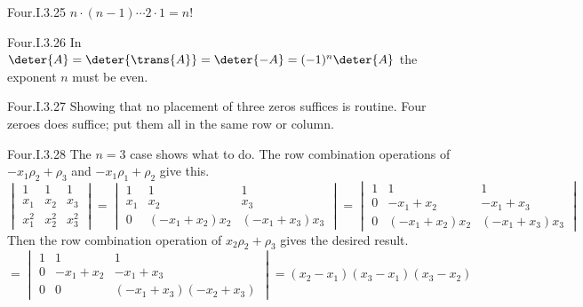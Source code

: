\begin{ans}{Four.I.3.25}
       \( n\cdot(n-1)\cdots 2\cdot 1=n! \)
    
\end{ans}
\begin{ans}{Four.I.3.26}
      In
      \( \deter{A}=\deter{\trans{A}}=\deter{-A}=(-1)^n\deter{A} \)
      the exponent $n$ must be even.
    
\end{ans}
\begin{ans}{Four.I.3.27}
      Showing that no placement of three zeros suffices is routine.
      Four zeroes does suffice; put them all in the same
      row or column.
    
\end{ans}
\begin{ans}{Four.I.3.28}
      The $n=3$ case shows what to do.
      The row combination operations of
      $-x_1\rho_2+\rho_3$ and $-x_1\rho_1+\rho_2$
      give this.
      \begin{equation*}
        \begin{vmatrix}
          1     &1     &1     \\
          x_1   &x_2   &x_3   \\
          x_1^2 &x_2^2 &x_3^2
        \end{vmatrix}
        =
        \begin{vmatrix}
          1     &1             &1             \\
          x_1   &x_2           &x_3           \\
          0     &(-x_1+x_2)x_2 &(-x_1+x_3)x_3
        \end{vmatrix}
        =
        \begin{vmatrix}
          1     &1             &1             \\
          0     &-x_1+x_2      &-x_1+x_3      \\
          0     &(-x_1+x_2)x_2 &(-x_1+x_3)x_3
        \end{vmatrix}
      \end{equation*}
      Then the row combination operation of $x_2\rho_2+\rho_3$ gives
      the desired result.
      \begin{equation*}
        =
        \begin{vmatrix}
          1     &1             &1                     \\
          0     &-x_1+x_2      &-x_1+x_3              \\
          0     &0             &(-x_1+x_3)(-x_2+x_3)
        \end{vmatrix}
        =(x_2-x_1)(x_3-x_1)(x_3-x_2)
      \end{equation*}
    
\end{ans}
